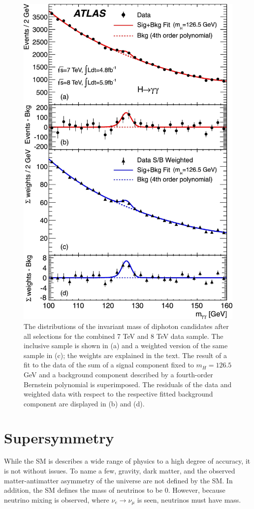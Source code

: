 		\begin{figure}[!ht]
		\centering
		\includegraphics[width=.7\textwidth,keepaspectratio=true]{chapters/chapter1_theory/images/Higgs_Discovery_gam_gam.jpeg}
		\caption{The distributions of the invariant mass of diphoton candidates after all selections for the combined 7 TeV and 8 TeV data sample. The inclusive sample is shown in (a) and a weighted version of the same sample in (c); the weights are explained in the text. The result of a fit to the data of the sum of a signal component fixed to $m_H=126.5$ GeV  and a background component described by a fourth-order Bernstein polynomial is superimposed. The residuals of the data and weighted data with respect to the respective fitted background component are displayed in (b) and (d).}
		\label{fig:higgs-discovery}
		\end{figure}

\section{Supersymmetry}\label{sec:SUSY}
	While the SM is describes a wide range of physics to a high degree of accuracy, it is not without issues. To name a few, gravity, dark matter, and the observed matter-antimatter asymmetry of the universe are not defined by the SM. In addition, the SM defines the mass of neutrinos to be 0. However, because neutrino mixing is observed, where $\nu_e \rightarrow \nu_\mu$ is seen, neutrinos must have mass. 

